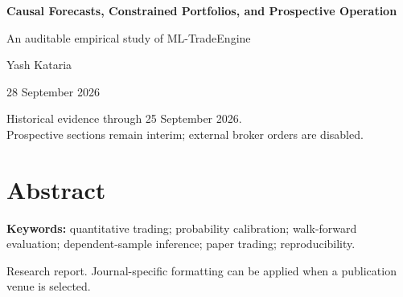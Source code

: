 \documentclass[11pt,a4paper]{article}
\begin{document}
\begin{titlepage}
\centering
\vspace*{8mm}
{\LARGE\bfseries Causal Forecasts, Constrained Portfolios, and Prospective Operation\par}
\vspace{5mm}
{\large An auditable empirical study of ML-TradeEngine\par}
\vspace{8mm}
{\Large Yash Kataria\par}
\vspace{6mm}
{28 September 2026\par}
\vspace{6mm}
{\small Historical evidence through 25 September 2026.\\Prospective sections remain interim; external broker orders are disabled.\par}
\vspace{10mm}
\begin{minipage}{.94\textwidth}
\section*{Abstract}

\par\medskip
\noindent\textbf{Keywords:} quantitative trading; probability calibration; walk-forward evaluation; dependent-sample inference; paper trading; reproducibility.
\end{minipage}
\vfill
{\small Research report. Journal-specific formatting can be applied when a publication venue is selected.\par}
\end{titlepage}
\setcounter{page}{2}
\tableofcontents
\clearpage
{}













\clearpage{}


\clearpage\appendix



\end{document}
